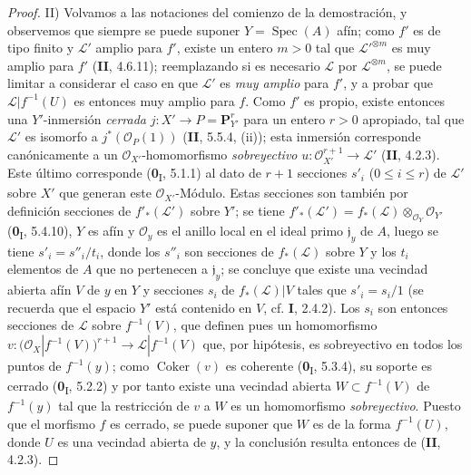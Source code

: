 \begin{proof}
\noindent II) Volvamos a las notaciones del comienzo de la demostración,
y observemos que
siempre se puede suponer $Y=\operatorname{Spec}(A)$
afín; como $f'$ es de tipo finito y $\mathcal L'$ amplio para $f'$,
existe un entero $m>0$ tal que $\mathcal L'^{\otimes m}$ es muy amplio para
$f'$ (\textbf{II}, 4.6.11); reemplazando si es necesario $\mathcal L$ por
$\mathcal L^{\otimes m}$, se puede limitar a considerar el caso en que
$\mathcal L'$ es \emph{muy amplio} para $f'$, y a probar que
$\mathcal L|f^{-1}(U)$ es entonces muy amplio para $f$. Como $f'$ es propio,
existe entonces una $Y'$-inmersión \emph{cerrada}
$j:X'\to P=\mathbf P_{Y'}^r$ para un entero $r>0$ apropiado, tal que
$\mathcal L'$ es isomorfo a $j^*(\mathcal O_P(1))$ (\textbf{II}, 5.5.4, (ii));
esta inmersión corresponde canónicamente a un $\mathcal O_{X'}$-homomorfismo
\emph{sobreyectivo}
$u:\mathcal O_{X'}^{r+1}\longrightarrow\mathcal L'$
(\textbf{II}, 4.2.3). Este último corresponde (\textbf{0}\textsubscript{I}, 5.1.1) al dato
de $r+1$ secciones $s'_i$ ($0\leq i\leq r$) de $\mathcal L'$ sobre
$X'$ que generan este $\mathcal O_{X'}$-Módulo. Estas secciones son también por
definición secciones de $f'_*(\mathcal L')$ sobre $Y'$; se tiene
$f'_*(\mathcal L')=f_*(\mathcal L)\otimes_{\mathcal O_Y}\mathcal O_{Y'}$
(\textbf{0}\textsubscript{I}, 5.4.10), $Y$ es afín y $\mathcal O_y$ es el anillo
local en el ideal primo $\mathfrak j_y$ de $A$, luego se tiene
$s'_i=s''_i/t_i$, donde los $s''_i$ son secciones de $f_*(\mathcal L)$
sobre $Y$ y los $t_i$ elementos de $A$ que no pertenecen a
$\mathfrak j_y$; se concluye que existe una vecindad abierta afín $V$
de $y$ en $Y$ y secciones $s_i$ de $f_*(\mathcal L)|V$ tales que
$s'_i=s_i/1$ (se recuerda que el espacio $Y'$ está contenido en $V$, cf. \textbf{I},
2.4.2). Los $s_i$ son entonces secciones de $\mathcal L$ sobre
$f^{-1}(V)$, que definen pues un homomorfismo
$v:\bigl(\mathcal O_X|f^{-1}(V)\bigr)^{r+1}
\longrightarrow\mathcal L|f^{-1}(V)$
que, por hipótesis, es sobreyectivo en todos los puntos de $f^{-1}(y)$; como
$\operatorname{Coker}(v)$ es coherente (\textbf{0}\textsubscript{I}, 5.3.4), su
soporte es cerrado (\textbf{0}\textsubscript{I}, 5.2.2) y por tanto existe una
vecindad abierta $W\subset f^{-1}(V)$ de $f^{-1}(y)$ tal que la restricción
de $v$ a $W$ es un homomorfismo \emph{sobreyectivo}. Puesto que el morfismo $f$ es
cerrado, se puede suponer que $W$ es de la forma $f^{-1}(U)$, donde $U$ es una
vecindad abierta de $y$, y la conclusión resulta entonces de (\textbf{II}, 4.2.3).
\end{proof}

